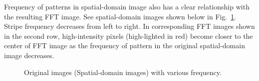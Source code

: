 Frequency of patterns in spatial-domain image also has a clear
relationship with the resulting FFT image. See spatial-domain images
shown below in Fig.~\ref{fig:FFTOriginalStripesFrequencies}. Stripe frequency decreases from left to right. In
corresponding FFT images shown in the second row, high-intensity pixels
(high-lighted in red) become closer to the center of FFT image as the
frequency of pattern in the original spatial-domain image decreases. 

\begin{figure}[htbp]
 \centering
 \caption{ Original images (Spatial-domain images) with various frequency.}
 \label{fig:FFTOriginalStripesFrequencies}
\end{figure} 

